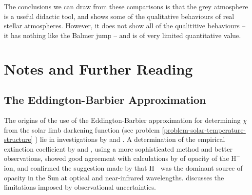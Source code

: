 The conclusions we can draw from these comparisons is that
the grey atmosphere is a useful didactic tool, and shows
some of the qualitative behaviours of real stellar
atmospheres. However, it does not show all of the
qualititive behaviours -- it has nothing like the Balmer
jump -- and is of very limited quantitative value.

\section{Notes and Further Reading}

\subsection{The Eddington-Barbier Approximation}

The origins of the use of the Eddington-Barbier approximation
for determining $\chi$ from the
solar limb darkening function (see problem \ref{problem-solar-temperature-structure}
) lie in investigations by
\cite{Milne-1922} and \cite{Lundblad-1923}. A determination
of the empirical extinction coefficient by \cite{Muench-1945} and
\cite{Chandrasekhar-1946b},
using a more sophisticated method and better observations,
showed good agreement with calculations by
\cite{Chandrasekhar-1946a} of opacity of the $\mathrm{H}^-$ ion,
and confirmed the suggestion made by \cite{Wildt-1939} that
$\mathrm{H}^-$ was the dominant source of opacity in the Sun at optical
and near-infrared wavelengths. \citet[pp.\
260--263]{Mihalas-1978} discusses the limitations imposed by
observational uncertainties.


